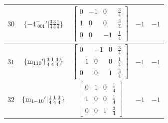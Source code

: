 \documentclass[fleqn,8pt]{jsarticle}
\begin{document}
\begin{longtable}{ccccc}
$ 30 $ & $ \{-4^{-}_{\,\,001}{}'|\frac{3}{4} \frac{3}{4} \frac{1}{4}\} $ & $ \begin{bmatrix} 0 & -1 & 0 & \frac{3}{4} \\ 1 & 0 & 0 & \frac{3}{4} \\ 0 & 0 & -1 & \frac{1}{4} \end{bmatrix} $ & $ -1 $ & $ -1 $ \\ \hline
$ 31 $ & $ \{{\rm m}_{110}{}'|\frac{3}{4} \frac{1}{4} \frac{3}{4}\} $ & $ \begin{bmatrix} 0 & -1 & 0 & \frac{3}{4} \\ -1 & 0 & 0 & \frac{1}{4} \\ 0 & 0 & 1 & \frac{3}{4} \end{bmatrix} $ & $ -1 $ & $ -1 $ \\ \hline
$ 32 $ & $ \{{\rm m}_{1-10}{}'|\frac{1}{4} \frac{1}{4} \frac{3}{4}\} $ & $ \begin{bmatrix} 0 & 1 & 0 & \frac{1}{4} \\ 1 & 0 & 0 & \frac{1}{4} \\ 0 & 0 & 1 & \frac{3}{4} \end{bmatrix} $ & $ -1 $ & $ -1 $ \\
\end{longtable}
\end{document}
